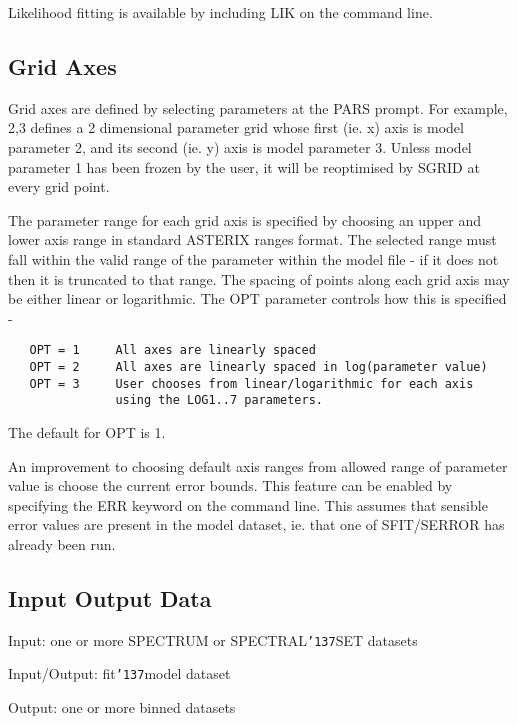 \documentclass{book}
\renewcommand{\_}{{\tt\char'137}}     %
\begin{document}
Likelihood fitting is available by including LIK on the
command line.

\subsection{Grid Axes}
Grid axes are defined by selecting parameters at the PARS prompt.
For example, 2,3 defines a 2 dimensional parameter grid whose
first (ie. x) axis is model parameter 2, and its second (ie. y)
axis is model parameter 3. Unless model parameter 1 has been
frozen by the user, it will be reoptimised by SGRID at every
grid point.

The parameter range for each grid axis is specified by choosing
an upper and lower axis range in standard ASTERIX ranges
format. The selected range must fall within the valid range of
the parameter within the model file - if it does not then it is
truncated to that range. The spacing of points along each grid
axis may be either linear or logarithmic. The OPT parameter
controls how this is specified -
\begin{verbatim}
   OPT = 1     All axes are linearly spaced
   OPT = 2     All axes are linearly spaced in log(parameter value)
   OPT = 3     User chooses from linear/logarithmic for each axis
               using the LOG1..7 parameters.
\end{verbatim}
The default for OPT is 1.

An improvement to choosing default axis ranges from allowed
range of parameter value is choose the current error bounds. This
feature can be enabled by specifying the ERR keyword on the
command line. This assumes that sensible error values are present
in the model dataset, ie. that one of SFIT/SERROR has already been
run.

\subsection{Input Output Data}
Input: one or more SPECTRUM or SPECTRAL\_SET datasets

Input/Output: fit\_model dataset

Output: one or more binned datasets
\end{document}
